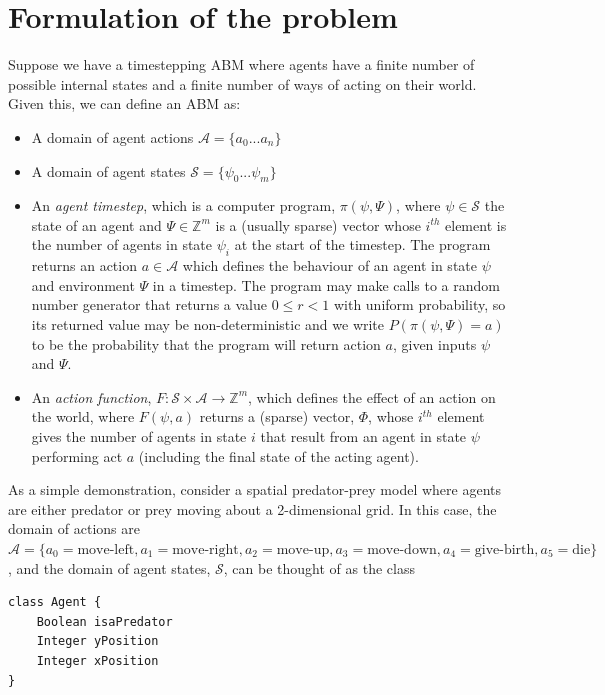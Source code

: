 \documentclass{article}
\begin{document}
\section{Formulation of the problem}


Suppose we have a timestepping ABM where agents have a finite number of possible internal states and a finite number of ways of acting on their world. Given this, we can define an ABM as:
\begin{itemize}
	\item A domain of agent actions $\mathcal{A} =\{ a_0 ... a_n \}$
	
	\item A domain of agent states $\mathcal{S} = \{\psi_0 ... \psi_m\}$
	
	\item An \textit{agent timestep}, which is a computer program, $\pi(\psi,\Psi)$, where $\psi \in \mathcal{S}$ the state of an agent and $\Psi \in \mathbb{Z}^m$ is a (usually sparse) vector whose $i^{th}$ element is the number of agents in state $\psi_i$ at the start of the timestep. The program returns an action $a \in \mathcal{A}$ which defines the behaviour of an agent in state $\psi$ and environment $\Psi$ in a timestep. The program may make calls to a random number generator that returns a value $0 \le r < 1$ with uniform probability, so its returned value may be non-deterministic and we write $P(\pi(\psi,\Psi)=a)$ to be the probability that the program will return action $a$, given inputs $\psi$ and $\Psi$. 
	
	\item An \textit{action function}, $F: \mathcal{S} \times \mathcal{A} \to \mathbb{Z}^m$, which defines the effect of an action on the world, where $F(\psi, a)$ returns a (sparse) vector, $\Phi$, whose $i^{th}$ element gives the number of agents in state $i$ that result from an agent in state $\psi$ performing act $a$ (including the final state of the acting agent).
\end{itemize}

As a simple demonstration, consider a spatial predator-prey model where agents are either predator or prey moving about a 2-dimensional grid. In this case, the domain of actions are $\mathcal{A} = \{ a_0=\textrm{move-left}, a_1=\textrm{move-right}, a_2=\textrm{move-up}, a_3=\textrm{move-down}, a_4=\textrm{give-birth}, a_5=\textrm{die}\}$, and the domain of agent states, $\mathcal{S}$, can be thought of as the class 
\begin{lstlisting}
class Agent {
	Boolean	isaPredator
	Integer	yPosition
	Integer	xPosition
}
\end{lstlisting}
\end{document}
